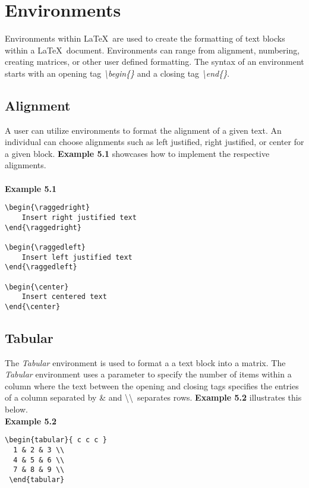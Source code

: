 \documentclass[11pt,twocolumn]{article}
\begin{document}
\section{Environments}
Environments within \LaTeX\ are used to create the formatting of text blocks within a \LaTeX\ document. Environments can range from alignment, numbering, creating matrices, or other user defined formatting. The syntax of an environment starts with an opening tag \textit{\textbackslash begin\{\}} and a closing tag \textit{\textbackslash end\{\}}.

\subsection{Alignment}
A user can utilize environments to format the alignment of a given text. An individual can choose alignments such as left justified, right justified, or center for a given block. \textbf{Example 5.1} showcases how to implement the respective alignments. \\ 
\pagebreak
\\
\noindent \textbf{Example 5.1}
\begin{verbatim}
\begin{\raggedright}
    Insert right justified text
\end{\raggedright}

\begin{\raggedleft} 
    Insert left justified text
\end{\raggedleft} 

\begin{\center} 
    Insert centered text
\end{\center} 
\end{verbatim}

\subsection{Tabular}
The \textit{Tabular} environment is used to format a a text block into a matrix. The \textit{Tabular} environment uses a parameter to specify the number of items within a column where the text between the opening and closing tags specifies the entries of a column separated by \& and \textbackslash \textbackslash \ separates rows. \textbf{Example 5.2} illustrates this  below. \\

\noindent \textbf{Example 5.2}
\begin{verbatim}
\begin{tabular}{ c c c } 
  1 & 2 & 3 \\ 
  4 & 5 & 6 \\ 
  7 & 8 & 9 \\ 
 \end{tabular}
\end{verbatim}
 
\end{document}
